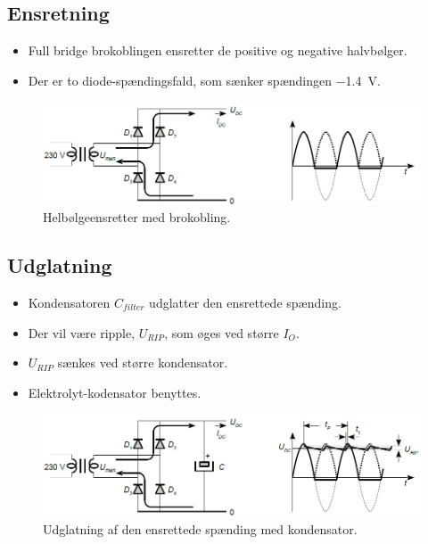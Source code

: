 \documentclass[danish]{article}
\begin{document}
\subsection{Ensretning}
\begin{itemize}
	\item Full bridge brokoblingen ensretter de positive og negative halvbølger.
	\item Der er to diode-spændingsfald, som sænker spændingen \approx \SI{-1.4}{\volt}.
\end{itemize}

\begin{figure} [H]
	\centering
	\includegraphics[width=\linewidth]{graphics/ensretning}
	\caption{Helbølgeensretter med brokobling.}
	\label{fig:ensretter}
\end{figure}

\subsection{Udglatning}
\begin{itemize}
	\item Kondensatoren $C_{filter}$ udglatter den ensrettede spænding.
	\item Der vil være ripple, $U_{RIP}$, som øges ved større $I_O$.
	\item $U_{RIP}$ sænkes ved større kondensator.
	\item Elektrolyt-kodensator benyttes.
\end{itemize}

\begin{figure} [H]
	\centering
	\includegraphics[width=\linewidth]{graphics/udglatning}
	\caption{Udglatning af den ensrettede spænding med kondensator.}
	\label{fig:udglatning}
\end{figure}
\end{document}
